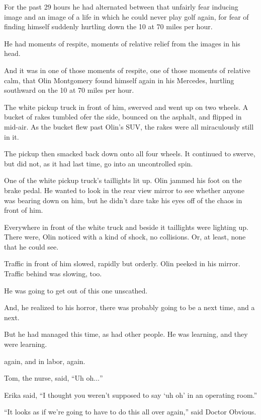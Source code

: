 For the past 29 hours he had alternated between that unfairly fear inducing image and an image of a life in which he could never play golf again, for fear of finding himself suddenly hurtling down the 10 at 70 miles per hour.

He had moments of respite, moments of relative relief from the images in his head.

And it was in one of those moments of respite, one of those moments of relative calm, that Olin Montgomery found himself again in his Mercedes, hurtling southward on the 10 at 70 miles per hour.

The white pickup truck in front of him, swerved and went up on two wheels. A bucket of rakes tumbled ofer the side, bounced on the asphalt, and flipped in mid-air. As the bucket flew past Olin's SUV, the rakes were all miraculously still in it.

The pickup then smacked back down onto all four wheels. It continued to swerve, but did not, as it had last time, go into an uncontrolled spin.

One of the white pickup truck's taillights lit up. Olin jammed his foot on the brake pedal. He wanted to look in the rear view mirror to see whether anyone was bearing down on him, but he didn't dare take his eyes off of the chaos in front of him.

Everywhere in front of the white truck and beside it taillights were lighting up. There were, Olin noticed with a kind of shock, no collisions. Or, at least, none that he could see.

Traffic in front of him slowed, rapidly but orderly. Olin peeked in his mirror. Traffic behind was slowing, too.

He was going to get out of this one unscathed.

And, he realized to his horror, there was probably going to be a next time, and a next.

But he had managed this time, as had other people. He was learning, and they were learning.




 again, and in labor, again.

Tom, the nurse, said, ``Uh oh$\ldots$''

Erika said, ``I thought you weren't supposed to say `uh oh' in an operating room.''

``It looks as if we're going to have to do this all over again,'' said Doctor Obvious.

